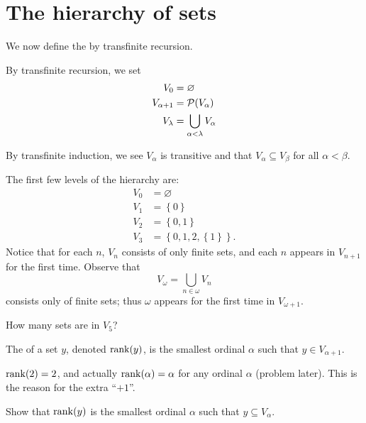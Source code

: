 \section{The hierarchy of sets}
We now define the  by transfinite recursion.
\begin{definition}
	By transfinite recursion, we set
	\begin{align*}
		V_0 &= \varnothing \\
		V_{\alpha + 1} &= \mathcal P(V_\alpha) \\
		V_\lambda &= \bigcup_{\alpha<\lambda} V_\alpha
	\end{align*}
\end{definition}
By transfinite induction, we see $V_\alpha$ is transitive
and that $V_\alpha \subseteq V_\beta$ for all $\alpha < \beta$.

\begin{example}
	The first few levels of the hierarchy are:
	\begin{align*}
		V_0 &= \varnothing \\
		V_1 &= \left\{ 0 \right\} \\
		V_2 &=  \left\{ 0, 1 \right\} \\
		V_3 &= \left\{ 0, 1, 2, \left\{ 1 \right\} \right\}.
	\end{align*}
	Notice that for each $n$, $V_n$ consists of only finite sets,
	and each $n$ appears in $V_{n+1}$ for the first time.
	Observe that
	\[ V_\omega = \bigcup_{n \in \omega} V_n \]
	consists only of finite sets; thus $\omega$ appears for the first time
	in $V_{\omega+1}$.
\end{example}
\begin{ques}
	How many sets are in $V_5$?
\end{ques}

\begin{definition}
	The  of a set $y$, denoted $\operatorname{rank}(y)$,
	is the smallest ordinal $\alpha$ such that $y \in V_{\alpha+1}$.
\end{definition}
\begin{example}
	$\operatorname{rank}(2) = 2$, and actually $\operatorname{rank}(\alpha)=\alpha$
	for any ordinal $\alpha$ (problem later).
	This is the reason for the extra ``$+1$''.
\end{example}
\begin{ques}
	Show that $\operatorname{rank}(y)$ is the smallest ordinal $\alpha$
	such that $y \subseteq V_\alpha$.
\end{ques}

